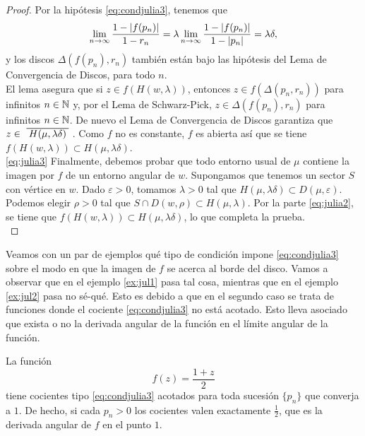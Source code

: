 \begin{proof}
    Por la hipótesis \eqref{eq:condjulia3}, tenemos que
    \begin{equation*}
        \lim_{n \to \infty} \frac{1-\left\lvert f(p_n)\right\rvert}{1-r_n} = \lambda \lim_{n \to \infty} \frac{1-\left\lvert f(p_n)\right\rvert}{1-\left\lvert p_n\right\rvert} = \lambda \delta,
    \end{equation*}
    y los discos $\Delta(f(p_n), r_n)$ también están bajo las hipótesis del Lema de Convergencia de Discos, para todo $n$. \\

    El lema asegura que si $z \in f(H(w, \lambda))$, entonces $z \in f(\Delta(p_n, r_n))$ para infinitos $n \in \mathbb{N}$ y, por el Lema de Schwarz-Pick, $z \in \Delta(f(p_n), r_n)$ para infinitos $n \in \mathbb{N}$. De nuevo el Lema de Convergencia de Discos garantiza que $z \in \xbar{H(\mu, \lambda \delta)}$. Como $f$ no es constante, $f$ es abierta así que se tiene $f(H(w, \lambda)) \subset H(\mu, \lambda \delta)$. \\

    \eqref{eq:julia3} Finalmente, debemos probar que todo entorno usual de $\mu$ contiene la imagen por $f$ de un entorno angular de $w$. Supongamos que tenemos un sector $S$ con vértice en $w$. Dado $\varepsilon > 0$, tomamos $\lambda > 0$ tal que $H(\mu, \lambda \delta) \subset D(\mu, \varepsilon)$. Podemos elegir $\rho > 0$ tal que $S \cap D(w, \rho) \subset H(\mu, \lambda)$. Por la parte \eqref{eq:julia2}, se tiene que $f(H(w, \lambda)) \subset H(\mu, \lambda \delta)$, lo que completa la prueba. \\
\end{proof}

Veamos con un par de ejemplos qué tipo de condición impone \eqref{eq:condjulia3} sobre el modo en que la imagen de $f$ se acerca al borde del disco. Vamos a observar que en el ejemplo \ref{ex:jul1} pasa tal cosa, mientras que en el ejemplo \ref{ex:jul2} pasa no sé-qué. Esto es debido a que en el segundo caso se trata de funciones donde el cociente \eqref{eq:condjulia3} no está acotado. Esto lleva asociado que exista o no la derivada angular de la función en el límite angular de la función. \\

\begin{example}
    \label{ex:jul1}
    La función
    \begin{equation*}
        f(z) = \frac{1 + z}{2}
    \end{equation*}
    tiene cocientes tipo \eqref{eq:condjulia3} acotados para toda sucesión $\{p_n\}$ que converja a $1$. De hecho, si cada $p_n > 0$ los cocientes valen exactamente $\frac{1}{2}$, que es la derivada angular de $f$ en el punto $1$. \\
\end{example}

